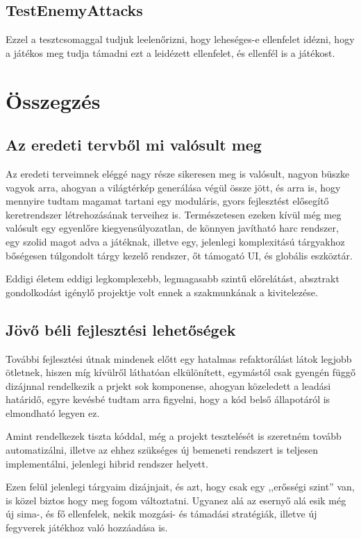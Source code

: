 \documentclass[
]{thesis-ekf}
\theoremstyle{definition}
\theoremstyle{remark}
\begin{document}
	\section{TestEnemyAttacks}
	Ezzel a tesztcsomaggal tudjuk leelenőrizni, hogy leheséges-e ellenfelet idézni, hogy a játékos meg tudja támadni ezt a leidézett ellenfelet, és ellenfél is a játékost.
	\chapter{Összegzés}
	
	\section{Az eredeti tervből mi valósult meg}
	Az eredeti terveimnek eléggé nagy része sikeresen meg is valósult, nagyon büszke vagyok arra, ahogyan a világtérkép generálása végül össze jött, és arra is, hogy mennyire tudtam magamat tartani egy moduláris, gyors fejlesztést elősegítő keretrendszer létrehozásának terveihez is. Természetesen ezeken kívül még meg valósult egy egyenlőre kiegyensúlyozatlan, de könnyen javítható harc rendszer, egy szolid magot adva a játéknak, illetve egy, jelenlegi komplexitású tárgyakhoz bőségesen túlgondolt tárgy kezelő rendszer, őt támogató UI, és globális eszköztár.
	
	Eddigi életem eddigi legkomplexebb, legmagasabb szintű előrelátást, absztrakt gondolkodást igénylő projektje volt ennek a szakmunkának a kivitelezése.
	\section{Jövő béli fejlesztési lehetőségek}
	További fejlesztési útnak mindenek előtt egy hatalmas refaktorálást látok legjobb ötletnek, hiszen míg kívülről láthatóan elkülönített, egymástól csak gyengén függő dizájnnal rendelkezik a prjekt sok komponense, ahogyan közeledett a leadási határidő, egyre kevésbé tudtam arra figyelni, hogy a kód belső állapotáról is elmondható legyen ez.
	
	Amint rendelkezek tiszta kóddal, még a projekt tesztelését is szeretném tovább automatizálni, illetve az ehhez szükséges új bemeneti rendszert is teljesen implementálni, jelenlegi hibrid rendszer helyett.
	
	Ezen felül jelenlegi tárgyaim dizájnjait, és azt, hogy csak egy ,,erősségi szint'' van, is közel biztos hogy meg fogom változtatni. Ugyanez alá az esernyő alá esik még új sima-, és fő ellenfelek, nekik mozgási- és támadási stratégiák, illetve új fegyverek játékhoz való hozzáadása is.
	
\end{document}
